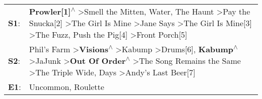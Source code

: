 \begin{supertabular}{p{0.03\textwidth}p{0.92\textwidth}}
 \textbf{S1}:  &                                \textbf{Prowler[1]\textsuperscript{$\wedge$}} \textgreater \enspace Smell the Mitten\textsuperscript{}, \enspace Water\textsuperscript{}, \enspace The Haunt\textsuperscript{} \textgreater \enspace Pay the Snucka[2]\textsuperscript{} \textgreater \enspace The Girl Is Mine\textsuperscript{} \textgreater \enspace Jane Says\textsuperscript{} \textgreater \enspace The Girl Is Mine[3]\textsuperscript{} \textgreater \enspace The Fuzz\textsuperscript{}, \enspace Push the Pig[4]\textsuperscript{} \textgreater \enspace Front Porch[5]\textsuperscript{}  \enspace  \\
 \textbf{S2}:  &  Phil's Farm\textsuperscript{} \textgreater \enspace \textbf{Visions\textsuperscript{$\wedge$}} \textgreater \enspace Kabump\textsuperscript{} \textgreater \enspace Drums[6]\textsuperscript{}, \enspace \textbf{Kabump\textsuperscript{$\wedge$}} \textgreater \enspace JaJunk\textsuperscript{} \textgreater \enspace \textbf{Out Of Order\textsuperscript{$\wedge$}} \textgreater \enspace The Song Remains the Same\textsuperscript{} \textgreater \enspace The Triple Wide\textsuperscript{},  Days\textsuperscript{} \textgreater \enspace Andy's Last Beer[7]\textsuperscript{}  \enspace  \\
 \textbf{E1}:  &                                                                                                                                                                                                                                                                                                                                                                                                                                                                                                                                    Uncommon\textsuperscript{}, \enspace Roulette\textsuperscript{}  \enspace  \\
\end{supertabular}

